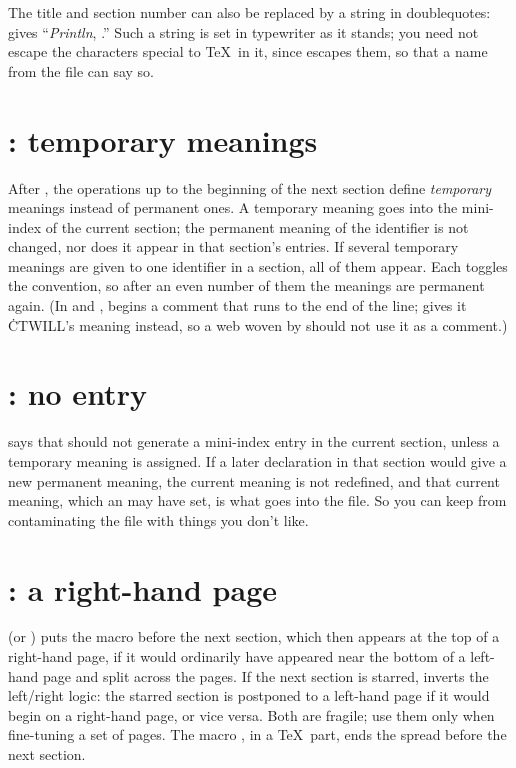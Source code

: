 The title and section number can also be replaced by a string in doublequotes:
 gives ``{\it Println}, .'' Such a string is
set in typewriter as it stands; you need not escape the characters special to
\TeX\ in it, since  escapes them, so that a name from the file
 can say so.

\section{: temporary meanings}
After , the  operations up to the beginning of the next section
define {\it temporary\/} meanings instead of permanent ones. A temporary meaning
goes into the mini-index of the current section; the permanent meaning of the
identifier is not changed, nor does it appear in that section's entries. If
several temporary meanings are given to one identifier in a section, all of them
appear. Each  toggles the convention, so after an even number of them
the meanings are permanent again. (In  and , 
begins a comment that runs to the end of the line;  gives it
\.{CTWILL}'s meaning instead, so a web woven by  should not use it as a
comment.)

\section{: no entry}
 says that  should not generate a mini-index entry in the
current section, unless a temporary meaning is assigned. If a later
declaration in that section would give  a new permanent meaning, the
current meaning is not redefined, and that current meaning, which an
 may have set, is what goes into the  file. So you can
keep  from contaminating the  file with things you don't
like.

\section{: a right-hand page}
 (or ) puts the macro  before the next section,
which then appears at the top of a right-hand page, if it would ordinarily have
appeared near the bottom of a left-hand page and split across the pages. If the
next section is starred,  inverts the left/right logic: the starred
section is postponed to a left-hand page if it would begin on a right-hand page,
or vice versa. Both are fragile; use them only when fine-tuning a set of pages.
The macro , in a \TeX\ part, ends the spread before the next
section.

